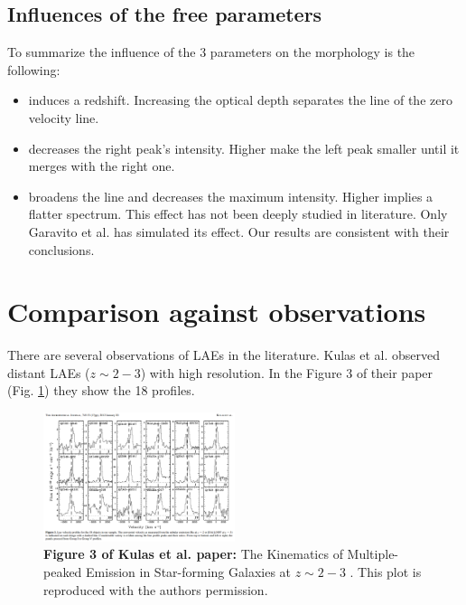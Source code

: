 \documentclass{latex/emulateapj}
\begin{document}
\subsection{Influences of the free parameters}

To summarize the influence of the 3 parameters on the \lya morphology is the following: 

\begin{itemize}
	\item \tauh induces a redshift. Increasing the optical depth separates the line of the zero velocity line. \\
	\item \vout decreases the right peak's intensity. Higher \vout make the left peak smaller until it merges with the right one. \\
	\item \vrot broadens the line and decreases the maximum intensity. Higher \vrot implies a flatter spectrum. This effect has not been deeply studied in literature. Only Garavito et al. \cite{Garavito14} has simulated its effect. Our results are consistent with their conclusions. 
\end{itemize}




\section{Comparison against observations}
\label{sec:comparisonobservations}

There are several observations of LAEs in the literature. Kulas et al. \cite{Kulas12} observed distant LAEs ($z\sim2-3$) with high resolution. In the Figure 3 of their paper (Fig. \ref{fig:kulas}) they show the 18 \lya profiles. \\

\begin{figure}[h!]
	\begin{center}
		\includegraphics[width=0.5\textwidth]{./figures/figure3_kulas}
	\end{center}
	\caption{\textbf{Figure 3 of Kulas et al. paper:} The Kinematics of Multiple-peaked \lya Emission in Star-forming Galaxies at $z\sim2-3$ \cite{Kulas12}. This plot is reproduced with the authors permission.
		\label{fig:kulas}}
\end{figure}
\end{document}
